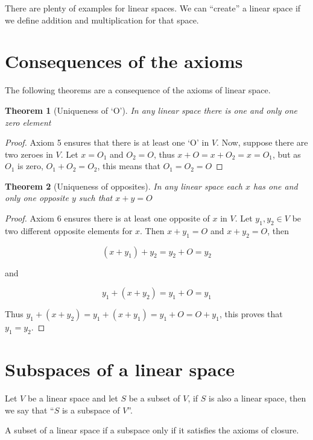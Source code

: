 \documentclass{book}
\newtheorem{theorem}{Theorem}[section]
\begin{document}
There are plenty of examples for linear spaces. We can ``create'' a linear
space if we define addition and multiplication for that space.

\section{Consequences of the axioms}

The following theorems are a consequence of the axioms of linear space.

\begin{theorem}[Uniqueness of `O']
    In any linear space there is one and only one zero element
\end{theorem}

\begin{proof}
    Axiom 5 ensures that there is at least one `O' in $V$. Now,
    suppose there are two zeroes in $V$. Let $x = O_1$ and $O_2 = O$,
    thus $x + O = x + O_2 = x = O_1$, but as $O_1$ is zero, $O_1 + O_2 = O_2$,
    this means that $O_1=O_2=O$
\end{proof}

\begin{theorem}[Uniqueness of opposites]
    In any linear space each $x$ has one and only one opposite $y$ such that $x+y=O$
\end{theorem}

\begin{proof}
    Axiom 6 ensures there is at least one opposite of $x$ in $V$. Let $y_1,y_2\in V$
    be two different opposite elements for $x$. Then $x+y_1=O$ and $x+y_2=O$, then

    \[
        (x + y_1) + y_2 = y_2 + O = y_2
    \]

    and

    \[
        y_1 + (x+y_2) = y_1 + O = y_1
    \]

    Thus $y_1 + (x+y_2) = y_1 + (x+y_1) = y_1 + O = O + y_1$, this proves that $y_1
        = y_2$.
\end{proof}

\section{Subspaces of a linear space}

Let $V$ be a linear space and let $S$ be a subset of $V$, if $S$ is also a
linear space, then we say that ``$S$ is a subspace of $V$''.

A subset of a linear space if a subspace only if it satisfies the axioms of
closure.
\end{document}
